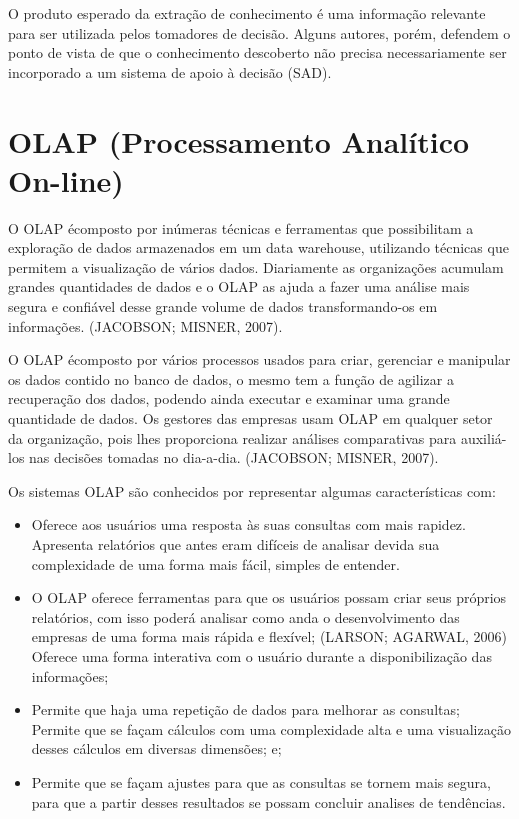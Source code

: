 O produto esperado da extra\c{c}\~{a}o de conhecimento \'{e} uma informa\c{c}\~{a}o relevante para ser utilizada pelos tomadores de decis\~{a}o. Alguns autores, por\'{e}m, defendem o ponto de vista de que o conhecimento descoberto n\~{a}o precisa necessariamente ser incorporado a um sistema de apoio \`{a} decis\~{a}o (SAD).

\section{OLAP (Processamento Analítico On-line)}

O OLAP \'{e}composto por inúmeras técnicas e ferramentas que possibilitam a exploração de dados armazenados em um data warehouse, utilizando técnicas que permitem a visualização de vários dados. Diariamente as organizações acumulam grandes quantidades de dados e o OLAP as ajuda a fazer uma análise mais segura e confiável desse grande volume de dados transformando-os em informações. (JACOBSON; MISNER, 2007).

O OLAP \'{e}composto por vários processos usados para criar, gerenciar e manipular os dados contido no banco de dados, o mesmo tem a função de agilizar a recuperação dos dados, podendo ainda executar e examinar uma grande quantidade de dados. Os gestores das empresas usam OLAP em qualquer setor da organização, pois lhes proporciona realizar análises comparativas para auxiliá-los nas decisões tomadas no dia-a-dia. (JACOBSON; MISNER, 2007).

Os sistemas OLAP são conhecidos por representar algumas características com:

\begin{itemize}
    
    \item Oferece aos usuários uma resposta às suas consultas com mais rapidez. Apresenta relatórios que antes eram difíceis de analisar devida sua complexidade de uma forma mais fácil, simples de entender.
    
    \item O OLAP oferece ferramentas para que os usuários possam criar seus próprios relatórios, com isso poderá analisar como anda o desenvolvimento das empresas de uma forma mais rápida e flexível; (LARSON; AGARWAL, 2006)
    Oferece uma forma interativa com o usuário durante a disponibilização das informações;
    
    \item Permite que haja uma repetição de dados para melhorar as consultas;
    Permite que se façam cálculos com uma complexidade alta e uma visualização desses cálculos em diversas dimensões; e;
    
    \item Permite que se façam ajustes para que as consultas se tornem mais segura, para que a partir desses resultados se possam concluir analises de tendências.

\end{itemize}

